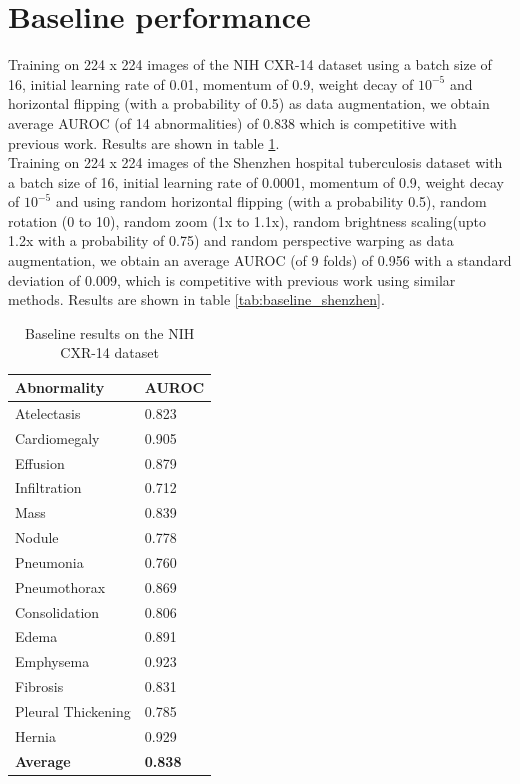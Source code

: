 \documentclass[12pt,oneside,a4paper]{report}
\begin{document}
\section{Baseline performance}
Training on 224 x 224 images of the NIH CXR-14 dataset using a batch size of 16,
initial learning rate of 0.01, momentum of 0.9, weight decay of $10^{-5}$ and
horizontal flipping (with a probability of 0.5) as data augmentation, we obtain
average AUROC (of 14 abnormalities) of 0.838 which is competitive with previous
work. Results are shown in table \ref{tab:baseline_nih}.\\

Training on 224 x 224 images of the Shenzhen hospital tuberculosis dataset with
a batch size of 16, initial learning rate of 0.0001, momentum of 0.9, weight
decay of $10^{-5}$ and using random horizontal flipping (with a probability
0.5), random rotation (0\textdegree{} to 10\textdegree{}), random zoom (1x to
1.1x), random brightness scaling(upto 1.2x with a probability of 0.75) and
random perspective warping as data augmentation, we obtain an average AUROC (of
9 folds) of 0.956 with a standard deviation of 0.009, which is
competitive with previous work using similar methods. Results are shown in
table \ref{tab:baseline_shenzhen}.\\

\begin{table}[]
  \centering
  \begin{tabular}{@{}ll@{}}
    \toprule
    \textbf{Abnormality} & \textbf{AUROC} \\ \midrule
    Atelectasis          & 0.823          \\ \midrule
    Cardiomegaly         & 0.905          \\ \midrule
    Effusion             & 0.879          \\ \midrule
    Infiltration         & 0.712 	  \\ \midrule
    Mass                 & 0.839          \\ \midrule
    Nodule               & 0.778   	  \\ \midrule
    Pneumonia            & 0.760          \\ \midrule
    Pneumothorax         & 0.869          \\ \midrule
    Consolidation        & 0.806 	  \\ \midrule
    Edema                & 0.891          \\ \midrule
    Emphysema            & 0.923          \\ \midrule
    Fibrosis             & 0.831 	  \\ \midrule
    Pleural Thickening  & 0.785          \\ \midrule
    Hernia               & 0.929          \\ \midrule
    \textbf{Average}     & \textbf{0.838}          \\ \bottomrule
  \end{tabular}
  \caption{Baseline results on the NIH CXR-14 dataset}
  \label{tab:baseline_nih}
\end{table}
\end{document}
